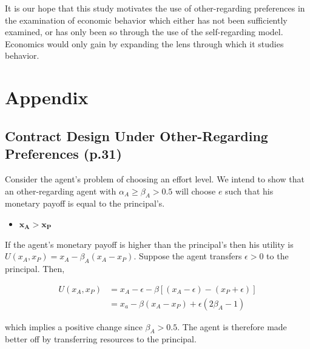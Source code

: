 \documentclass[12pt]{article}
\begin{document}
It is our hope that this study motivates the use of other-regarding preferences in the examination of economic behavior which either has not been sufficiently examined, or has only been so through the use of the self-regarding model. Economics would only gain by expanding the lens through which it studies behavior. 
 

\newpage

\medskip




\newpage

\section{Appendix}
\subsection{Contract Design Under Other-Regarding Preferences (p.31)}

Consider the agent's problem of choosing an effort level. We intend to show that an other-regarding agent with $\alpha_A \geq \beta_A > 0.5$ will choose $e$ such that his monetary payoff is equal to the principal's. 

\begin{itemize}
\item $\mathbf{x_A > x_P}$
\end{itemize}


If the agent's monetary payoff is higher than the principal's then his utility is $U\left(x_A, x_P \right) = x_A - \beta_A \left(x_A-x_P\right)$. Suppose the agent transfers $\epsilon >0$ to the principal. Then,

\begin{equation*}
\begin{split}
 U\left(x_A,x_P \right) & = x_A - \epsilon - \beta \left[\left(x_A - \epsilon\right)-\left(x_P + \epsilon \right) \right] \\
& = x_a - \beta\left(x_A - x_P \right) + \epsilon \left(2\beta_A-1\right)
\end{split}
\end{equation*}

\noindent
which implies a positive change since $\beta_A >0.5$. The agent is therefore made better off by transferring resources to the principal.
\end{document}
